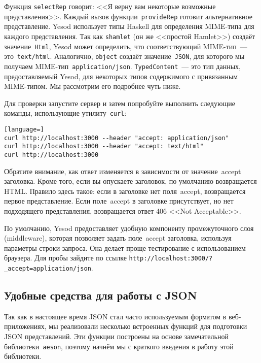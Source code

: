 
Функция \lstinline'selectRep' говорит: <<Я верну вам некоторые возможные
представления>>. Каждый вызов функции~\lstinline'provideRep' готовит
альтернативное представление. Yesod использует типы Haskell для определения
MIME-типа для каждого представления. Так как \lstinline'shamlet' (он же
<<простой Hamlet>>) создаёт значение~\lstinline'Html', Yesod может определить,
что соответствующий MIME-тип~--- это~\texttt{text/html}. Аналогично,
\lstinline'object' создаёт значение~\lstinline'JSON', для которого мы получаем
MIME-тип~\texttt{application/json}. \lstinline'TypedContent'~--- это тип
данных, предоставляемый Yesod, для некоторых типов содержимого с привязанным
MIME-типом. Мы рассмотрим его подробнее чуть ниже.

Для проверки запустите сервер и затем попробуйте выполнить следующие команды,
использующие утилиту~\texttt{curl}:

\begin{lstlisting}[language=]
curl http://localhost:3000 --header "accept: application/json"
curl http://localhost:3000 --header "accept: text/html"
curl http://localhost:3000
\end{lstlisting}

Обратите внимание, как ответ изменяется в зависимости от значение~accept
заголовка. Кроме того, если вы опускаете заголовок, по умолчанию возвращается
HTML. Правило здесь такое: если в заголовке нет поля~accept, возвращается
первое представление. Если поле~accept в заголовке присутствует, но нет
подходящего представления, возвращается ответ 406 <<Not Acceptable>>.

По умолчанию, Yesod предоставляет удобную компоненту промежуточного слоя
(middleware), которая позволяет задать поле~accept заголовка, используя
параметры строки запроса. Она делает проще тестирование с использованием
браузера. Для пробы зайдите по ссылке
\texttt{http://localhost:3000/?\_accept=application/json}.

\subsection{Удобные средства для работы с JSON}
Так как в настоящее время JSON стал часто используемым форматом в
веб-приложениях, мы реализовали несколько встроенных функций для подготовки
JSON представлений. Эти функции построены на основе замечательной
библиотеки~\texttt{aeson}, поэтому начнём мы с краткого введения в работу этой
библиотеки.

